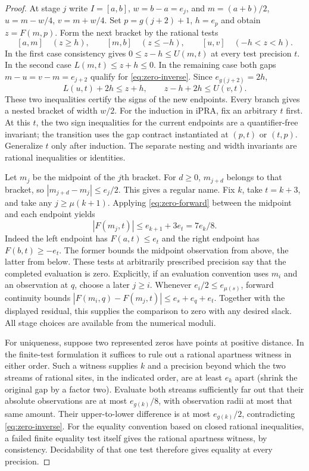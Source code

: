 \begin{proof}
At stage $j$ write $I=[a,b]$, $w=b-a=e_j$, and
$m=(a+b)/2$, $u=m-w/4$, $v=m+w/4$. Set $p=g(j+2)+1$, $h=e_p$ and obtain
$z=F(m,p)$. Form the next bracket by the rational tests
\[
 [a,m]\quad(z\ge h),\qquad [m,b]\quad(z\le-h),\qquad
 [u,v]\quad(-h<z<h).
\]
In the first case consistency gives $0\le z-h\le U(m,t)$ at every
test precision $t$. In the second case $L(m,t)\le z+h\le0$.
In the remaining case both gaps $m-u=v-m=e_{j+2}$ qualify for
\eqref{eq:zero-inverse}. Since $e_{g(j+2)}=2h$,
\[
 L(u,t)+2h\le z+h,\qquad z-h+2h\le U(v,t).
\]
These two inequalities certify the signs of the new endpoints. Every
branch gives a nested bracket of width $w/2$. For the induction in iPRA,
fix an arbitrary $t$ first. At this $t$, the two sign inequalities for the
current endpoints are a quantifier-free invariant; the transition uses the
gap contract instantiated at $(p,t)$ or $(t,p)$. Generalize $t$ only after
induction. The separate nesting and width invariants are rational
inequalities or identities.

Let $m_j$ be the midpoint of the $j$th bracket. For $d\ge0$,
$m_{j+d}$ belongs to that bracket, so $|m_{j+d}-m_j|\le e_j/2$.
This gives a regular name. Fix $k$, take $t=k+3$, and take any
$j\ge\mu(k+1)$. Applying \eqref{eq:zero-forward} between the midpoint and
each endpoint yields
\[
 |F(m_j,t)|\le e_{k+1}+3e_t=7e_k/8.
\]
Indeed the left endpoint has $F(a,t)\le e_t$ and the right endpoint has
$F(b,t)\ge-e_t$. The former bounds the midpoint observation from above,
the latter from below. These tests at arbitrarily prescribed precision say
that the completed evaluation is zero. Explicitly, if an evaluation
convention uses $m_i$ and an observation at $q$, choose a later $j\ge i$.
Whenever $e_i/2\le e_{\mu(s)}$, forward continuity bounds
$|F(m_i,q)-F(m_j,t)|\le e_s+e_q+e_t$. Together with the displayed
residual, this supplies the comparison to zero with any desired slack.
All stage choices are available from the numerical moduli.

For uniqueness, suppose two represented zeros have points at positive
distance. In the finite-test formulation it suffices to rule out a rational
apartness witness in either order. Such a witness supplies $k$ and a
precision beyond which the two streams of rational sites, in the indicated
order, are at least $e_k$ apart (shrink the original gap by a factor two).
Evaluate both streams sufficiently far out that their absolute observations
are at most $e_{g(k)}/8$, with observation radii at most that same amount.
Their upper-to-lower difference is at most $e_{g(k)}/2$, contradicting
\eqref{eq:zero-inverse}. For the equality convention based on closed
rational inequalities, a failed finite equality test itself gives the
rational apartness witness, by consistency. Decidability of that one test
therefore gives equality at every precision.


\end{proof}
